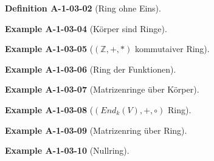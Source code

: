 \documentclass[10pt, letterpaper]{article}
\newcommand{\Z}{\mathbb{Z}}
\newcommand{\CustomHeading}[3]{%
  \par\medskip\noindent%
  \textbf{#1 #2} \textnormal{(#3)}.\enskip%
}
\newenvironment{DEF}[2]{\CustomHeading{Definition}{#1}{#2}}{}
\newenvironment{EXA}[2]{\CustomHeading{Example}{#1}{#2}}{}
\begin{document}

\begin{DEF}{A-1-03-02}{Ring ohne Eins}
\end{DEF}


\begin{EXA}{A-1-03-04}{Körper sind Ringe}
\end{EXA}


\begin{EXA}{A-1-03-05}{$(\Z,+,*)$ kommutaiver Ring}
\end{EXA}


\begin{EXA}{A-1-03-06}{Ring der Funktionen}
\end{EXA}


\begin{EXA}{A-1-03-07}{Matrizenringe über Körper}
\end{EXA}


\begin{EXA}{A-1-03-08}{$(End_k(V),+,\circ)$ Ring}
\end{EXA}


\begin{EXA}{A-1-03-09}{Matrizenring über Ring}
\end{EXA}


\begin{EXA}{A-1-03-10}{Nullring}
\end{EXA}
\end{document}
